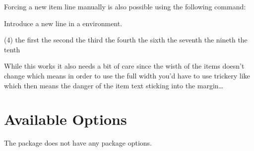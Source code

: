 \documentclass[load-preamble+]{cnltx-doc}
\begin{document}
Forcing a new item line manually is also possible using the
following command:
\begin{commands}
    Introduce a new line in a  environment.
\end{commands}
\begin{example}
  \begin{tasks}(4)
    \task the first
    \task the second
    \task the third
    \task the fourth
    \task {}
      \startnewitemline 
    \task the sixth
    \task the seventh
    \task {} \startnewitemline
    \task the nineth
    \task the tenth
  \end{tasks}
\end{example}

While this works it also needs a bit of care since the wisth of the items
doesn't change which means in order to use the full width you'd have to use
trickery like  which then means the danger of the item text sticking
into the margin\ldots

\section{Available Options}\label{sec:tasks:options}

The \Tasks{} package does not have any package options.
\end{document}
